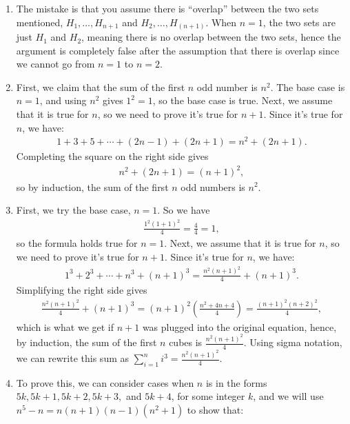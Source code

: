\documentclass[12pt]{article}
\begin{document}
\begin{enumerate}
    \item The mistake is that you assume there is ``overlap'' between
    the two sets mentioned, $H_1, \ldots ,H_{n+1}$ and $H_2, \ldots ,H_(n+1)$. 
    When $n = 1$, the two sets are just $H_1$ and $H_2$, meaning there is no overlap
    between the two sets, hence the argument is completely false after the assumption
    that there is overlap since we cannot go from $n = 1$ to $n = 2$.
    \item First, we claim that the sum of the first $n$ odd number is $n^2$. The
    base case is $n = 1$, and using $n^2$ gives $1^2 = 1$, so the base case is true.
    Next, we assume that it is true for $n$, so we need to prove it's true for 
    $n+1$. Since it's true for $n$, we have: 
    \begin{align*}
        1 + 3 + 5 + \cdots + (2n-1) + (2n+1) = n^2 + (2n+1).
    \end{align*}
    Completing the square on the right side gives \begin{align*}
        n^2 + (2n+1) = (n+1)^2,
    \end{align*}
    so by induction, the sum of the first $n$ odd numbers is $n^2$.
    \item First, we try the base case, $n = 1$. So we have \begin{align*}
        \frac{1^{2}(1+1)^{2}}{4} = \frac{4}{4} = 1,
    \end{align*}
    so the formula holds true for $n = 1$. Next, we assume that it is true
    for $n$, so we need to prove it's true for $n+1$. Since it's true for $n$, 
    we have: \begin{align*}
        1^3 + 2^3 +\cdots+n^3+(n+1)^3 = \frac{n^2(n+1)^2}{4} + (n+1)^3.
    \end{align*}
    Simplifying the right side gives \begin{align*}
        \frac{n^2(n+1)^2}{4} + (n+1)^3 = (n+1)^2(\frac{n^2+4n+4}{4}) = \frac{(n+1)^2(n+2)^2}{4},
    \end{align*}
    which is what we get if $n+1$ was plugged into the original equation, hence, by 
    induction, the sum of the first $n$ cubes is $\frac{n^2(n+1)^2}{4}$. Using 
    sigma notation, we can rewrite this sum as $\sum_{i=1}^{n} i^3 = \frac{n^2(n+1)^2}{4}$.
    \item To prove this, we can consider cases when $n$ is in the forms $5k, 5k+1, 
    5k +2, 5k+3,$ and $5k+4$, for some integer $k$, and we will use $n^5-n = n(n+1)(n-1)(n^2+1)$ to show that:

\end{enumerate}
\end{document}
